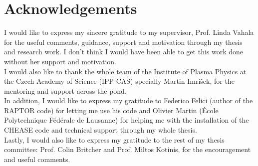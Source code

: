 \chapter*{Acknowledgements}
I would like to express my sincere gratitude to my supervisor, Prof. Linda Vahala for the useful comments, guidance, support and motivation through my thesis and research work. I don't think I would have been able to get this work done without her support and motivation.\\

I would also like to thank the whole team of the Institute of Plasma Physics at the Czech Academy of Science (IPP-CAS) specially Martin Imríšek, for the mentoring and support across the pond.\\

In addition, I would like to express my gratitude to Federico Felici (author of the RAPTOR code) for letting me use his code and Olivier Martin (École Polytechnique Fédérale de Lausanne) for helping me with the installation of the CHEASE code and technical support through my whole thesis. \\

Lastly, I would also like to express my gratitude to the rest of my thesis committee: Prof. Colin Britcher and Prof. Miltos Kotinis, for the encouragement and useful comments. 